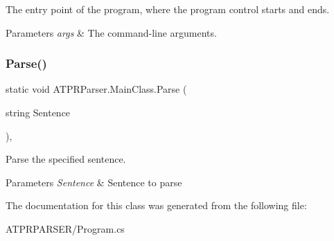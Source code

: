 The entry point of the program, where the program control starts and ends. 


\begin{DoxyParams}{Parameters}
{\em args} & The command-\/line arguments.\\
\hline
\end{DoxyParams}
\hypertarget{class_a_t_p_r_parser_1_1_main_class_a1c0e43fd38d99a01c9b9ead51d2da1e5}{}\label{class_a_t_p_r_parser_1_1_main_class_a1c0e43fd38d99a01c9b9ead51d2da1e5} 
\subsubsection{\texorpdfstring{Parse()}{Parse()}}
{\footnotesize\ttfamily static void A\+T\+P\+R\+Parser.\+Main\+Class.\+Parse (\begin{DoxyParamCaption}\item[{string}]{Sentence }\end{DoxyParamCaption})\hspace{0.3cm}{\ttfamily [inline]}, {\ttfamily [static]}}



Parse the specified sentence. 


\begin{DoxyParams}{Parameters}
{\em Sentence} & Sentence to parse\\
\hline
\end{DoxyParams}


The documentation for this class was generated from the following file\+:\begin{DoxyCompactItemize}
\item 
A\+T\+P\+R\+P\+A\+R\+S\+E\+R/Program.\+cs\end{DoxyCompactItemize}
